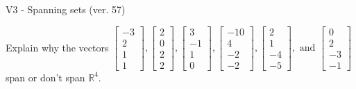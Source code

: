 \begin{exercise}
  \begin{exerciseTitle}V3 - Spanning sets (ver. 57)\end{exerciseTitle}
  \begin{exerciseStatement}
    Explain why the vectors \(\left[\begin{array}{r}
-3 \\
2 \\
1 \\
1
\end{array}\right] , \left[\begin{array}{r}
2 \\
0 \\
2 \\
2
\end{array}\right] , \left[\begin{array}{r}
3 \\
-1 \\
1 \\
0
\end{array}\right] , \left[\begin{array}{r}
-10 \\
4 \\
-2 \\
-2
\end{array}\right] , \left[\begin{array}{r}
2 \\
1 \\
-4 \\
-5
\end{array}\right] , \text{ and } \left[\begin{array}{r}
0 \\
2 \\
-3 \\
-1
\end{array}\right]\) span or don't span \(\mathbb{R}^4\). 
	



\end{exerciseStatement}
\end{exercise}
